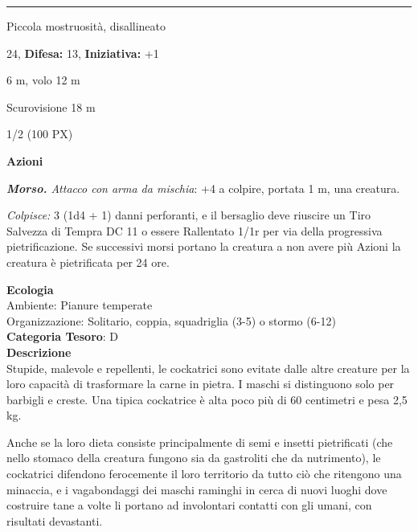 \begin{multicols}{2}
{\smallskip\noindent\rule{\linewidth}{2pt}  \hypertarget{Cockatrice}{}\medskip
{}
\begin{description}[noitemsep, topsep=0pt, parsep=0pt, partopsep=0pt, leftmargin=0cm, labelwidth=2.2cm]
	\item[\textbf{Taglia/Tipo:}] Piccola mostruosità, disallineato
	\item[\textbf{Caratt.:}] 
	\item[\textbf{Punti Ferita:}] 24,  \textbf{Difesa:} 13,  \textbf{Iniziativa:} +1
	\item[\textbf{Movimento:}] 6 m, volo 12 m
	\item[\textbf{Tiri Salvez.:}] 
	\item[\textbf{Sensi:}] Scurovisione 18 m
	\item[\textbf{Sfida:}] 1/2 (100 PX)\smallskip
\end{description}

\textbf{Azioni}

\emph{\textbf{Morso.} Attacco con arma da mischia}: +4 a colpire, portata 1 m, una creatura.

\emph{Colpisce:} 3 (1d4 + 1) danni perforanti, e il bersaglio deve riuscire un Tiro Salvezza di Tempra DC 11 o essere Rallentato 1/1r per via della progressiva pietrificazione. Se successivi morsi portano la creatura a non avere più Azioni la creatura è pietrificata per 24 ore.

\textbf{Ecologia}\\
Ambiente: Pianure temperate\\
Organizzazione: Solitario, coppia, squadriglia (3-5) o stormo (6-12)\\
\textbf{Categoria Tesoro}: D\\
\textbf{Descrizione}\\
Stupide, malevole e repellenti, le cockatrici sono evitate dalle altre creature per la loro capacità di trasformare la carne in pietra. I maschi si distinguono solo per barbigli e creste. Una tipica cockatrice è alta poco più di 60 centimetri e pesa 2,5 kg.

Anche se la loro dieta consiste principalmente di semi e insetti pietrificati (che nello stomaco della creatura fungono sia da gastroliti che da nutrimento), le cockatrici difendono ferocemente il loro territorio da tutto ciò che ritengono una minaccia, e i vagabondaggi dei maschi raminghi in cerca di nuovi luoghi dove costruire tane a volte li portano ad involontari contatti con gli umani, con risultati devastanti.

}
\end{multicols}

